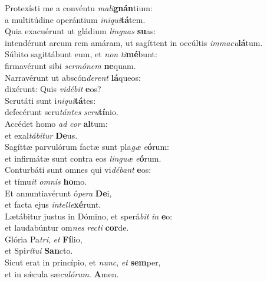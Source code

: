 \evenverse Protexísti me a convéntu \textit{ma}\textit{li}\textbf{gnán}tium:~\*\\
\evenverse a multitúdine operántium \textit{i}\textit{ni}\textit{qui}\textbf{tá}tem.\\
\oddverse Quia exacuérunt ut gládium \textit{lin}\textit{guas} \textbf{su}as:~\*\\
\oddverse intendérunt arcum rem amáram, ut sagíttent in occúltis \textit{im}\textit{ma}\textit{cu}\textbf{lá}tum.\\
\evenverse Súbito sagittábunt eum, et \textit{non} \textit{ti}\textbf{mé}bunt:~\*\\
\evenverse firmavérunt sibi \textit{ser}\textit{mó}\textit{nem} \textbf{ne}quam.\\
\oddverse Narravérunt ut abscón\textit{de}\textit{rent} \textbf{lá}queos:~\*\\
\oddverse dixérunt: Quis \textit{vi}\textit{dé}\textit{bit} \textbf{e}os?\\
\evenverse Scrutáti sunt i\textit{ni}\textit{qui}\textbf{tá}tes:~\*\\
\evenverse defecérunt scru\textit{tán}\textit{tes} \textit{scru}\textbf{tí}nio.\\
\oddverse Accédet homo \textit{ad} \textit{cor} \textbf{al}tum:~\*\\
\oddverse et exal\textit{tá}\textit{bi}\textit{tur} \textbf{De}us.\\
\evenverse Sagíttæ parvulórum factæ sunt pla\textit{gæ} \textit{e}\textbf{ó}rum:~\*\\
\evenverse et infirmátæ sunt contra eos \textit{lin}\textit{guæ} \textit{e}\textbf{ó}rum.\\
\oddverse Conturbáti sunt omnes qui vi\textit{dé}\textit{bant} \textbf{e}os:~\*\\
\oddverse et tímu\textit{it} \textit{om}\textit{nis} \textbf{ho}mo.\\
\evenverse Et annuntiavérunt ó\textit{pe}\textit{ra} \textbf{De}i,~\*\\
\evenverse et facta ejus \textit{in}\textit{tel}\textit{le}\textbf{xé}runt.\\
\oddverse Lætábitur justus in Dómino, et sperá\textit{bit} \textit{in} \textbf{e}o:~\*\\
\oddverse et laudabúntur om\textit{nes} \textit{re}\textit{cti} \textbf{cor}de.\\
\evenverse Glória Pa\textit{tri}, \textit{et} \textbf{Fí}lio,~\*\\
\evenverse et Spi\textit{rí}\textit{tu}\textit{i} \textbf{San}cto.\\
\oddverse Sicut erat in princípio, et \textit{nunc}, \textit{et} \textbf{sem}per,~\*\\
\oddverse et in sǽcula sæ\textit{cu}\textit{ló}\textit{rum}. \textbf{A}men.\\
